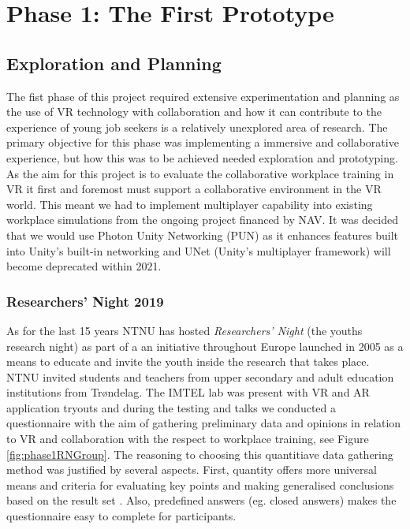 
\chapter{Phase 1: The First Prototype}
\label{chap:phase1}

\section{Exploration and Planning}
The fist phase of this project required extensive experimentation and planning as the use of VR technology with collaboration and how it can contribute to the experience of young job seekers is a relatively unexplored area of research. The primary objective for this phase was implementing a immersive and collaborative experience, but how this was to be achieved needed exploration and prototyping. As the aim for this project is to evaluate the collaborative workplace training in VR it first and foremost must support a collaborative environment in the VR world. This meant we had to implement multiplayer capability into existing workplace simulations from the ongoing project financed by NAV. It was decided that we would use Photon Unity Networking (PUN) \cite{PUN} as it enhances features built into Unity's built-in networking and UNet (Unity's multiplayer framework) will become deprecated within 2021.               

\subsection{Researchers' Night 2019}
As for the last 15 years NTNU has hosted \textit{Researchers' Night} (the youths research night) as part of a an initiative throughout Europe launched in 2005 as a means to educate and invite the youth inside the research that takes place. NTNU invited students and teachers from upper secondary and adult education institutions from Trøndelag. The IMTEL lab was present with VR and AR application tryouts and during the testing and talks we conducted a questionnaire with the aim of gathering preliminary data and opinions in relation to VR and collaboration with the respect to workplace training, see Figure \ref{fig:phase1RNGroup}. The reasoning to choosing this quantitiave data gathering method was justified by several aspects. First, quantity offers more universal means and criteria for evaluating key points and making generalised conclusions based on the result set \cite{oates2005researching}. Also, predefined answers (eg. closed answers) makes the questionnaire easy to complete for participants.

